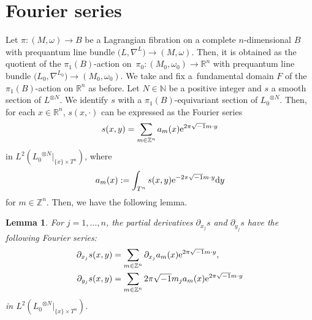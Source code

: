 \documentclass[pdftex]{sigma}
\numberwithin{equation}{section}
\newtheorem{Lemma}[Theorem]{Lemma}
\newcommand{\R}{\mathbb{R}}
\newcommand{\Z}{\mathbb{Z}}
\newcommand{\N}{\mathbb{N}}
\begin{document}
\appendix
\section{Fourier series}\label{appendixA}
Let $\pi\colon (M,\omega)\to B$ be a Lagrangian fibration on a complete $n$-dimensional $B$ with prequantum line bundle $\bigl(L,\nabla^L\bigr)\to (M,\omega)$. Then, it is obtained as the quotient of the $\pi_1(B)$-action on~${\pi_0\colon (M_0,\omega_0)\to \R^n}$ with prequantum line bundle $\bigl({L_0}, \nabla^{L_0}\bigr)\to (M_0,\omega_0)$. We take and fix a~fundamental domain $F$ of the $\pi_1(B)$-action on $\R^n$ as before.
%
Let $N\in \N$ be a positive integer and $s$ a smooth section of $L^{\otimes N}$. We identify $s$ with a $\pi_1(B)$-equivariant section of ${L_0}^{\otimes N}$. Then, for each $x\in \R^n$, $s(x, \cdot )$ can be expressed as the Fourier series
\begin{equation}\label{Fourier_again}
s(x,y)=\sum_{m\in \Z^n}a_m(x){\rm e}^{2\pi\sqrt{-1}m\cdot y}
\end{equation}
in $L^2\left({L_0}^{\otimes N}|_{\{x\}\times T^n}\right)$, where
\[
a_m(x):=\int_{T^n}s(x,y){\rm e}^{-2\pi\sqrt{-1}m\cdot y}{\rm d}y
\]
for $m\in \Z^n$. Then, we have the following lemma.
\begin{Lemma}\label{Fourier for derivatives}
For $j=1,\ldots , n$, the partial derivatives $\partial_{x_j}s$ and $\partial_{y_j}s$ have the following Fourier series:
\begin{align*}
\partial_{x_j}s(x,y)&=\sum_{m\in \Z^n}\partial_{x_j}a_m(x){\rm e}^{2\pi\sqrt{-1}m\cdot y},\\%
\partial_{y_j}s(x,y)&=\sum_{m\in \Z^n}2\pi\sqrt{-1}m_ja_m(x){\rm e}^{2\pi\sqrt{-1}m\cdot y} %
\end{align*}
in $L^2\left({L_0}^{\otimes N}|_{\{x\}\times T^n}\right)$.
\end{Lemma}
\end{document}
